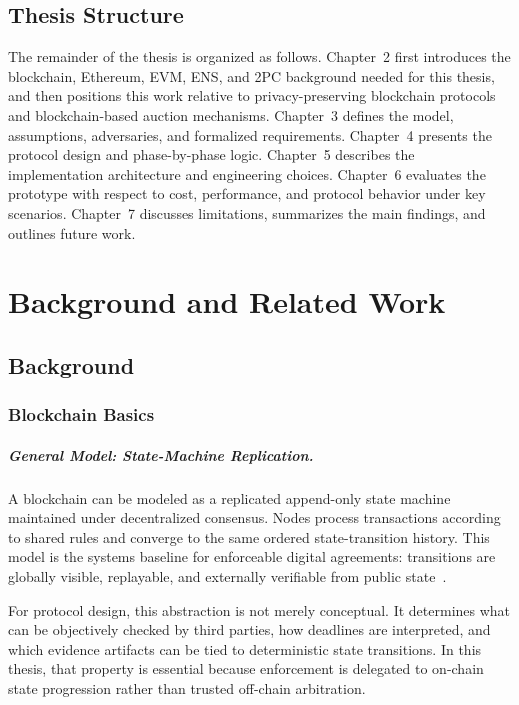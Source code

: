 \documentclass[final,twoside]{vutinfth}
\begin{document}
\section{Thesis Structure}
The remainder of the thesis is organized as follows.
Chapter~2 first introduces the blockchain, Ethereum, EVM, ENS, and 2PC background needed for this thesis, and then positions this work relative to privacy-preserving blockchain protocols and blockchain-based auction mechanisms. Chapter~3 defines the model, assumptions, adversaries, and formalized requirements.
Chapter~4 presents the protocol design and phase-by-phase logic.
Chapter~5 describes the implementation architecture and engineering choices.
Chapter~6 evaluates the prototype with respect to cost, performance, and protocol behavior under key scenarios.
Chapter~7 discusses limitations, summarizes the main findings, and outlines future work.

\chapter{Background and Related Work}
\section{Background}

\subsection{Blockchain Basics}
\paragraph*{General Model: State-Machine Replication.}
A blockchain can be modeled as a replicated append-only state machine maintained under decentralized consensus. Nodes process transactions according to shared rules and converge to the same ordered state-transition history. This model is the systems baseline for enforceable digital agreements: transitions are globally visible, replayable, and externally verifiable from public state~\cite{Wood2025Ethereum}.

For protocol design, this abstraction is not merely conceptual. It determines what can be objectively checked by third parties, how deadlines are interpreted, and which evidence artifacts can be tied to deterministic state transitions. In this thesis, that property is essential because enforcement is delegated to on-chain state progression rather than trusted off-chain arbitration.
\end{document}
